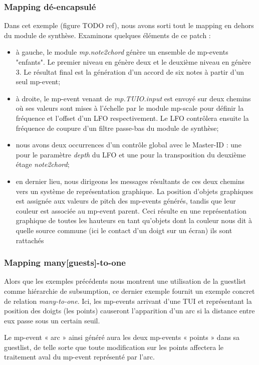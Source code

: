 \subsubsection{Mapping dé-encapsulé}

Dans cet exemple (figure TODO ref), nous avons sorti tout le mapping en dehors du module de synthèse. Examinons quelques éléments de ce patch :
\vspace{-1em}
\begin{itemize}[noitemsep]
	\item à gauche, le module \textit{mp.note2chord} génère un ensemble de mp-events "enfants". Le premier niveau en génère deux et le deuxième niveau en génère 3. Le résultat final est la génération d'un accord de six notes à partir d'un seul mp-event;
	\item à droite, le mp-event venant de \textit{mp.TUIO.input} est envoyé sur deux chemins où ses valeurs sont mises à l'échelle par le module mp-scale pour définir la fréquence et l'offset d'un LFO respectivement. Le LFO contrôlera ensuite la fréquence de coupure d'un filtre passe-bas du module de synthèse;
	\item nous avons deux occurrences d'un contrôle global avec le Master-ID : une pour le paramètre \textit{depth} du LFO et une pour la transposition du deuxième étage \textit{note2chord};
	\item en dernier lieu, nous dirigeons les messages résultants de ces deux chemins vers un système de représentation graphique. La position d'objets graphiques est assignée aux valeurs de pitch des mp-events générés, tandis que leur couleur est associée au mp-event parent. Ceci résulte en une représentation graphique de toutes les hauteurs en tant qu'objets dont la couleur nous dit à quelle source commune (ici le contact d'un doigt sur un écran) ils sont rattachés
\end{itemize}

\subsubsection*{Mapping many[guests]-to-one}
Alors que les exemples précédents nous montrent une utilisation de la guestlist comme hiérarchie de subsumption, ce dernier exemple fournit un exemple concret de relation \textit{many-to-one}. Ici, les mp-events arrivant d'une \gls{TUI} et représentant la position des doigts (les points) causeront l'apparition d'un arc si la distance entre eux passe sous un certain seuil.

Le mp-event « arc » ainsi généré aura les deux mp-events « points » dans sa guestlist, de telle sorte que toute modification sur les points affectera le traitement aval du mp-event représenté par l'arc.

